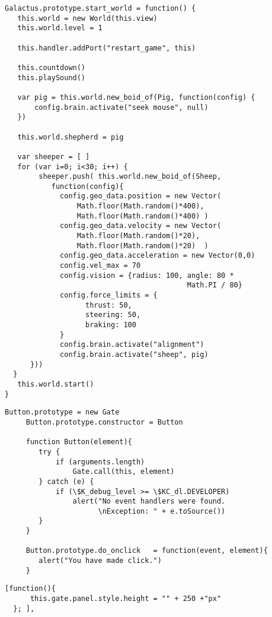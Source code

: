 \begin{lstlisting}[caption=Función start world]
Galactus.prototype.start_world = function() {
   this.world = new World(this.view)
   this.world.level = 1

   this.handler.addPort("restart_game", this)
   
   this.countdown()
   this.playSound()

   var pig = this.world.new_boid_of(Pig, function(config) {
       config.brain.activate("seek mouse", null)
   })

   this.world.shepherd = pig

   var sheeper = [ ]
   for (var i=0; i<30; i++) {
        sheeper.push( this.world.new_boid_of(Sheep, 
           function(config){
             config.geo_data.position = new Vector(
                 Math.floor(Math.random()*400), 
                 Math.floor(Math.random()*400) )
             config.geo_data.velocity = new Vector(
                 Math.floor(Math.random()*20), 
                 Math.floor(Math.random()*20)  )
             config.geo_data.acceleration = new Vector(0,0)
             config.vel_max = 70
             config.vision = {radius: 100, angle: 80 * 
                                           Math.PI / 80}           
             config.force_limits = {
                   thrust: 50,
                   steering: 50,
                   braking: 100
             }
             config.brain.activate("alignment")
             config.brain.activate("sheep", pig)
      }))
  }
   this.world.start()
}
\end{lstlisting}

\begin{lstlisting}[caption=Clase Button]
     Button.prototype = new Gate
     Button.prototype.constructor = Button

     function Button(element){
        try {
            if (arguments.length)
                Gate.call(this, element)
        } catch (e) {
            if (\$K_debug_level >= \$KC_dl.DEVELOPER)
                alert("No event handlers were found.
                      \nException: " + e.toSource())
        }
     }

     Button.prototype.do_onclick   = function(event, element){
        alert("You have made click.")
     }
\end{lstlisting}


\begin{lstlisting}[caption=Estado out]
  [function(){
      this.gate.panel.style.height = "" + 250 +"px" 
  }; ],
\end{lstlisting}


